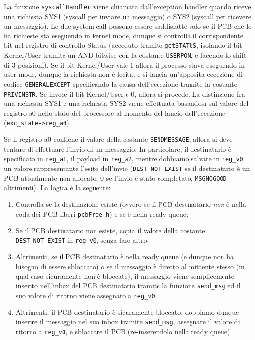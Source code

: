 \documentclass[a4paper]{article}
\begin{document}
La funzione \verb+syscallHandler+ viene chiamata dall'exception handler quando riceve una richiesta SYS1 (syscall per inviare un messaggio) o SYS2 (syscall per ricevere un messaggio). Le due system call possono essere soddisfatte solo se il PCB che le ha richieste sta eseguendo in kernel mode, dunque si controlla il corrispondente bit nel registro di controllo Status (acceduto tramite \verb+getSTATUS+, isolando il bit Kernel/User tramite un AND bitwise con la costante \verb+USERPON+, e facendo lo shift di 3 posizioni). Se il bit Kernel/User vale 1 allora il processo stava eseguendo in user mode, dunque la richiesta non è lecita, e si lancia un'apposita eccezione di codice \verb+GENERALEXCEPT+ specificando la causa dell'eccezione tramite la costante \verb+PRIVINSTR+. Se invece il bit Kernel/User è 0, allora si procede. La distinzione fra una richiesta SYS1 e una richiesta SYS2 viene effettuata basandosi sul valore del registro a0 nello stato del processore al momento del lancio dell'eccezione (\verb+exc_state->reg_a0+).

Se il registro a0 contiene il valore della costante \verb+SENDMESSAGE+, allora si deve tentare di effettuare l'invio di un messaggio. In particolare, il destinatario è specificato in \verb+reg_a1+, il payload in \verb+reg_a2+, mentre dobbiamo salvare in \verb+reg_v0+ un valore rappresentante l'esito dell'invio (\verb+DEST_NOT_EXIST+ se il destinatario è un PCB attualmente non allocato, 0 se l'invio è stato completato, \verb+MSGNOGOOD+ altrimenti). La logica è la seguente:
\begin{enumerate}
\item Controlla se la destinazione esiste (ovvero se il PCB destinatario \emph{non} è nella coda dei PCB liberi \verb+pcbFree_h+) e se è nella ready queue;
\item Se il PCB destinatario non esiste, copia il valore della costante \verb+DEST_NOT_EXIST+ in \verb+reg_v0+, senza fare altro.
\item Altrimenti, se il PCB destinatario è nella ready queue (e dunque non ha bisogno di essere sbloccato) o se il messaggio è diretto al mittente stesso (in qual caso sicuramente non è bloccato), il messaggio viene semplicemente inserito nell'inbox del PCB destinatario tramite la funzione \verb+send_msg+ ed il suo valore di ritorno viene assegnato a  \verb+reg_v0+.
\item Altrimenti, il PCB destinatario è sicuramente bloccato; dobbiamo dunque inserire il messaggio nel suo inbox tramite \verb+send_msg+, assegnare il valore di ritorno a \verb+reg_v0+, e sbloccare il PCB (re-inserendolo nella ready queue).
\end{enumerate}
\end{document}
